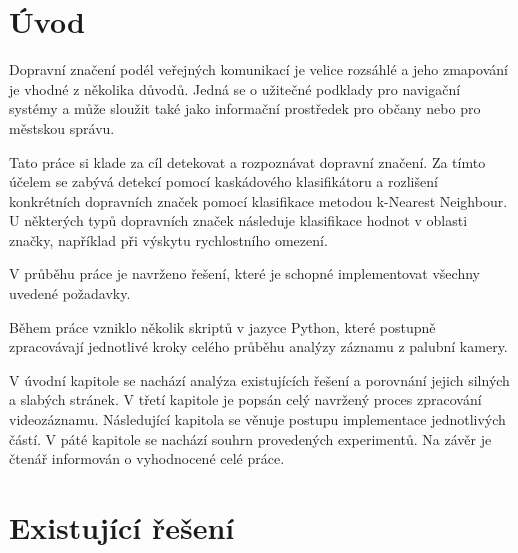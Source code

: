 \documentclass[czech]{ExcelAtFIT} %
\affiliation{*%
  \href{mailto:xkader13@fit.vutbr.cz}{xkader13@fit.vutbr.cz},
  \textit{Faculty of Information Technology, Brno University of Technology}}
\begin{document}
\startdocument



\section{Úvod}
% 
% 
% 
Dopravní značení podél veřejných komunikací je velice rozsáhlé a jeho zmapování je vhodné z několika důvodů. Jedná se o užitečné podklady pro navigační systémy a může sloužit také jako informační prostředek pro občany nebo pro městskou správu.

Tato práce si klade za cíl detekovat a rozpoznávat dopravní značení. Za tímto účelem se zabývá detekcí pomocí kaskádového klasifikátoru a rozlišení konkrétních dopravních značek pomocí klasifikace metodou k-Nearest Neighbour. U některých typů dopravních značek následuje klasifikace hodnot v oblasti značky, například při výskytu rychlostního omezení.

V průběhu práce je navrženo řešení, které je schopné implementovat všechny uvedené požadavky. 

Během práce vzniklo několik skriptů v jazyce Python, které postupně zpracovávají jednotlivé kroky celého průběhu analýzy záznamu z palubní kamery.

V úvodní kapitole se nachází analýza existujících řešení a porovnání jejich silných a slabých stránek. V třetí kapitole je popsán celý navržený proces zpracování videozáznamu. Následující kapitola se věnuje postupu implementace jednotlivých částí. V páté kapitole se nachází souhrn provedených experimentů. Na závěr je čtenář informován o vyhodnocené celé práce.


\section{Existující řešení}
\label{sec:HowToUse}
% 
% 
\end{document}
